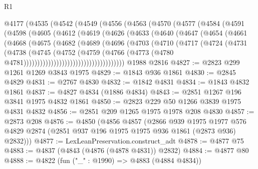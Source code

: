 \begin{lexlean}{R1}
\begin{coremodule}
    @4177
      (@4535
        (@4542
          (@4549
            (@4556
              (@4563
                (@4570
                  (@4577
                    (@4584
                      (@4591
                        (@4598
                          (@4605
                            (@4612
                              (@4619
                                (@4626
                                  (@4633
                                    (@4640
                                      (@4647
                                        (@4654
                                          (@4661
                                            (@4668
                                              (@4675
                                                (@4682
                                                  (@4689
                                                    (@4696
                                                      (@4703
                                                        (@4710
                                                          (@4717
                                                            (@4724
                                                              (@4731
                                                                (@4738
                                                                  (@4745
                                                                    (@4752
                                                                      (@4759
                                                                        (@4766
                                                                          (@4773
                                                                            (@4780
                                                                              @4781)))))))))))))))))))))))))))))))))))))
    @1988
    @2816
@4827 := @2823 @299 @1261 @1269 @3843 @1975
@4829 := @1843 @936 @1861
@4830 := @2845 @4829
@4831 := @2767 @4830
@4832 := @1842 @4831
@4834 := @1843 @4832 @1861
@4837 := @4827 @4834 (@1886 @4834)
@4843 := @2851 @1267 @196 @3841 @1975 @4832 @1861
@4850 := @2823 @229 @50 @1266 @3839 @1975 @4831 @4832
@4856 := @2851 @209 @1265 @1975 @1978 @208 @4830
@4857 := @2873 @208
@4876 := @4850
    (@4856
      @4857
      (@2866
        @939
        @1975
        @1977
        @576
        @4829
        @2874
        (@2851 @937 @196 @1975 @1975 @936 @1861 (@2873 @936) @2832)))
@4877 := LexLeanPreservation.construct_adt
@4878 := @4877 @75
@4883 := @4837 (@4843 (@4876 (@4878 @4831)) @2832)
@4884 := @4877 @80
@4888 := @4822 (fun ("_" : @1990) => @4883 (@4884 @4834))

\end{coremodule}
\end{lexlean}
